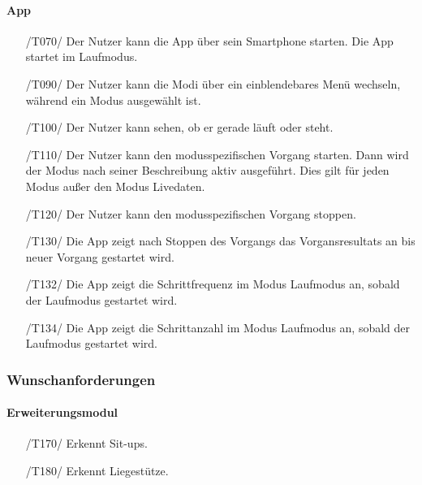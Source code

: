\documentclass[a4paper,12pt]{article}
\begin{document}
  \paragraph{App}
    \begin{itemize}
    \item[/T070/] Der Nutzer kann die App über sein Smartphone starten. Die App startet im Laufmodus.
    \item[/T090/] Der Nutzer kann die Modi über ein einblendebares Menü wechseln, während ein Modus ausgewählt ist.
    \item[/T100/] Der Nutzer kann sehen, ob er gerade \glqq läuft\grqq{} oder \glqq steht\grqq{}.
    \item[/T110/] Der Nutzer kann den modusspezifischen \Gls{Vorgang} starten. Dann wird der Modus nach seiner Beschreibung aktiv ausgeführt. Dies gilt für jeden Modus außer den Modus \glqq Livedaten\grqq.
    \item[/T120/] Der Nutzer kann den modusspezifischen \Gls{Vorgang} stoppen.
    \item[/T130/] Die App zeigt nach Stoppen des Vorgangs das Vorgansresultats an bis neuer \Gls{Vorgang} gestartet wird.
    \item[/T132/] Die App zeigt die \gls{Schrittfrequenz} im Modus \glqq{}Laufmodus\grqq{} an, sobald der Laufmodus gestartet wird.
    \item[/T134/] Die App zeigt die Schrittanzahl im Modus \glqq{}Laufmodus\grqq{} an, sobald der Laufmodus gestartet wird.
  \end{itemize}

\subsubsection{Wunschanforderungen}
  \paragraph{Erweiterungsmodul}
    \begin{itemize}
    \item[/T170/] Erkennt Sit-ups. 
    \item[/T180/] Erkennt Liegestütze.
  \end{itemize}
\end{document}

